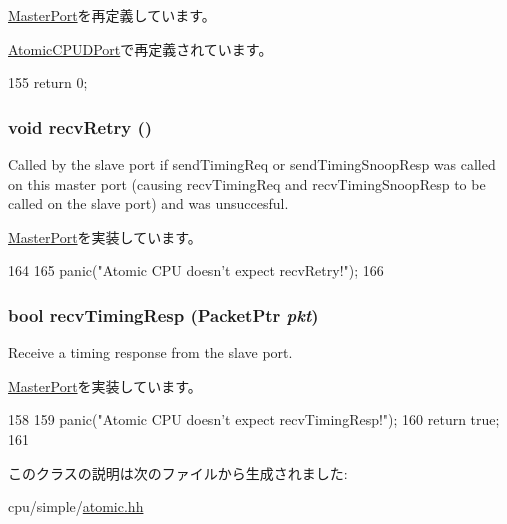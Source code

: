 \hyperlink{classMasterPort_ae1160d8f94f042aba1dc9a07a72e1e82}{MasterPort}を再定義しています。

\hyperlink{classAtomicSimpleCPU_1_1AtomicCPUDPort_a886d584c81ee4e398ff8069907f6e1a5}{AtomicCPUDPort}で再定義されています。


\begin{DoxyCode}
155 { return 0; }
\end{DoxyCode}
\hypertarget{classAtomicSimpleCPU_1_1AtomicCPUPort_a29cb5a4f98063ce6e9210eacbdb35298}{
\subsubsection[{recvRetry}]{\setlength{\rightskip}{0pt plus 5cm}void recvRetry ()}}
\label{classAtomicSimpleCPU_1_1AtomicCPUPort_a29cb5a4f98063ce6e9210eacbdb35298}
Called by the slave port if sendTimingReq or sendTimingSnoopResp was called on this master port (causing recvTimingReq and recvTimingSnoopResp to be called on the slave port) and was unsuccesful. 

\hyperlink{classMasterPort_ac1ccc3bcf7ebabb20b57fab99b2be5b0}{MasterPort}を実装しています。


\begin{DoxyCode}
164         {
165             panic("Atomic CPU doesn't expect recvRetry!\n");
166         }
\end{DoxyCode}
\hypertarget{classAtomicSimpleCPU_1_1AtomicCPUPort_a482dba5588f4bee43e498875a61e5e0b}{
\subsubsection[{recvTimingResp}]{\setlength{\rightskip}{0pt plus 5cm}bool recvTimingResp ({\bf PacketPtr} {\em pkt})}}
\label{classAtomicSimpleCPU_1_1AtomicCPUPort_a482dba5588f4bee43e498875a61e5e0b}
Receive a timing response from the slave port. 

\hyperlink{classMasterPort_abd323548d6c93f8b0543f1fe3a86ca35}{MasterPort}を実装しています。


\begin{DoxyCode}
158         {
159             panic("Atomic CPU doesn't expect recvTimingResp!\n");
160             return true;
161         }
\end{DoxyCode}


このクラスの説明は次のファイルから生成されました:\begin{DoxyCompactItemize}
\item 
cpu/simple/\hyperlink{atomic_8hh}{atomic.hh}\end{DoxyCompactItemize}
